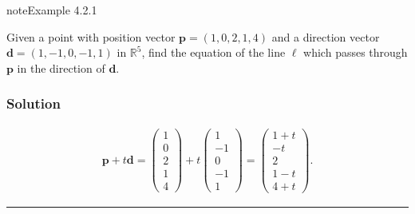 \documentclass[letterpaper,10pt,english]{jupyterBook}
\begin{document}
\label{_pages/4.1_Lines:line-vector-equation-example}
\begin{sphinxadmonition}{note}{Example 4.2.1}



\sphinxAtStartPar
Given a point with position vector \(\mathbf{p} = (1, 0, 2, 1, 4)\) and a direction vector \(\mathbf{d} = (1, -1, 0, -1, 1)\) in \(\mathbb{R}^5\), find the equation of the line \(\ell\) which passes through \(\mathbf{p}\) in the direction of \(\mathbf{d}\).
\subsubsection*{Solution}
\begin{equation*}
\begin{split} \mathbf{p} + t\mathbf{d}
= \begin{pmatrix} 1 \\ 0 \\ 2 \\ 1 \\ 4 \end{pmatrix} + t
\begin{pmatrix} 1 \\ -1 \\ 0 \\ -1 \\ 1 \end{pmatrix}
= \begin{pmatrix} 1 + t \\ -t \\ 2 \\ 1 - t \\ 4 + t \end{pmatrix}. \end{split}
\end{equation*}\end{sphinxadmonition}


\bigskip\hrule\bigskip


\ignorespaces 
\end{document}
